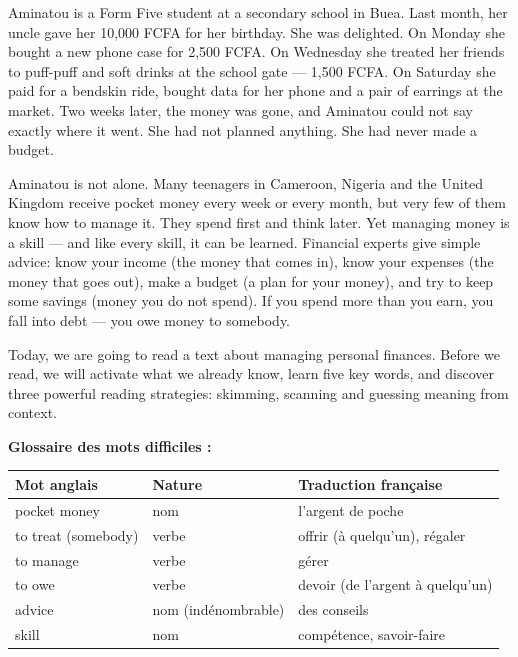 \documentclass[11pt]{article}
\begin{document}
\begin{textebox}
Aminatou is a Form Five student at a secondary school in Buea. Last month, her uncle gave her 10,000 FCFA for her birthday. She was delighted. On Monday she bought a new phone case for 2,500 FCFA. On Wednesday she treated her friends to puff-puff and soft drinks at the school gate — 1,500 FCFA. On Saturday she paid for a bendskin ride, bought data for her phone and a pair of earrings at the market. Two weeks later, the money was gone, and Aminatou could not say exactly where it went. She had not planned anything. She had never made a budget.

Aminatou is not alone. Many teenagers in Cameroon, Nigeria and the United Kingdom receive pocket money every week or every month, but very few of them know how to manage it. They spend first and think later. Yet managing money is a skill — and like every skill, it can be learned. Financial experts give simple advice: know your income (the money that comes in), know your expenses (the money that goes out), make a budget (a plan for your money), and try to keep some savings (money you do not spend). If you spend more than you earn, you fall into debt — you owe money to somebody.

Today, we are going to read a text about managing personal finances. Before we read, we will activate what we already know, learn five key words, and discover three powerful reading strategies: skimming, scanning and guessing meaning from context.
\end{textebox}

\textbf{Glossaire des mots difficiles :}

\begin{center}
\begin{tabularx}{\linewidth}{|l|l|X|}
\hline
\rowcolor{popblueL} \textbf{Mot anglais} & \textbf{Nature} & \textbf{Traduction française} \\
\hline
pocket money & nom & l'argent de poche \\
\hline
to treat (somebody) & verbe & offrir (à quelqu'un), régaler \\
\hline
to manage & verbe & gérer \\
\hline
to owe & verbe & devoir (de l'argent à quelqu'un) \\
\hline
advice & nom (indénombrable) & des conseils \\
\hline
skill & nom & compétence, savoir-faire \\
\hline
\end{tabularx}
\end{center}
\end{document}
